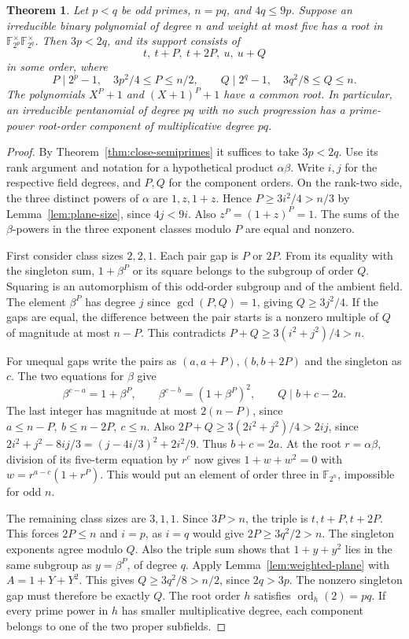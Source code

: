 \documentclass[11pt]{article}
\newtheorem{theorem}{Theorem}
\begin{document}
\begin{theorem}\label{thm:semiprime-gap}
Let \(p<q\) be odd primes, \(n=pq\), and \(4q\le9p\). Suppose an
irreducible binary polynomial of degree \(n\) and weight at most five
has a root in \(\mathbb F_{2^p}^\times\mathbb F_{2^q}^\times\).
Then \(3p<2q\), and its support consists of
\[
      t,\ t+P,\ t+2P,\ u,\ u+Q
\]
in some order, where
\[
  P\mid 2^p-1,\quad 3p^2/4\le P\le n/2,\qquad
  Q\mid 2^q-1,\quad 3q^2/8\le Q\le n .
\]
The polynomials \(X^P+1\) and \((X+1)^P+1\) have a common root.
In particular, an irreducible pentanomial of degree \(pq\) with no such progression has a prime-power
root-order component of multiplicative degree \(pq\).
\end{theorem}
\begin{proof}
By Theorem~\ref{thm:close-semiprimes} it suffices to take \(3p<2q\).
Use its rank argument and notation for a hypothetical product
\(\alpha\beta\). Write \(i,j\) for the respective field degrees,
and \(P,Q\) for the component orders. On the rank-two side, the
three distinct powers of \(\alpha\) are \(1,z,1+z\). Hence
\(P\ge3i^2/4>n/3\) by Lemma~\ref{lem:plane-size}, since
\(4j<9i\). Also \(z^P=(1+z)^P=1\). The sums of the \(\beta\)-powers
in the three exponent classes modulo \(P\) are equal and nonzero.

First consider class sizes \(2,2,1\). Each pair gap is \(P\) or
\(2P\). From its equality with the singleton sum, \(1+\beta^P\)
or its square belongs to the subgroup of order \(Q\). Squaring is
an automorphism of this odd-order subgroup and of the ambient field.
The element \(\beta^P\) has degree \(j\) since \(\gcd(P,Q)=1\),
giving \(Q\ge3j^2/4\). If the gaps are equal, the difference between
the pair starts is a nonzero multiple of \(Q\) of magnitude at most
\(n-P\). This contradicts \(P+Q\ge3(i^2+j^2)/4>n\).

For unequal gaps write the pairs as \((a,a+P),(b,b+2P)\) and the
singleton as \(c\). The two equations for \(\beta\) give
\[
   \beta^{c-a}=1+\beta^P,\qquad
   \beta^{c-b}=(1+\beta^P)^2,\qquad Q\mid b+c-2a.
\]
The last integer has magnitude at most \(2(n-P)\), since
\(a\le n-P,\ b\le n-2P,\ c\le n\).
Also \(2P+Q\ge3(2i^2+j^2)/4>2ij\), since
\(2i^2+j^2-8ij/3=(j-4i/3)^2+2i^2/9\).
Thus \(b+c=2a\). At the root \(r=\alpha\beta\), division of its
five-term equation by \(r^c\) now gives \(1+w+w^2=0\) with
\(w=r^{a-c}(1+r^P)\). This would put an element of order three in
\(\mathbb F_{2^n}\), impossible for odd \(n\).

The remaining class sizes are \(3,1,1\). Since \(3P>n\), the
triple is \(t,t+P,t+2P\). This forces \(2P\le n\) and \(i=p\),
as \(i=q\) would give \(2P\ge3q^2/2>n\). The singleton exponents
agree modulo \(Q\). Also the triple sum shows that \(1+y+y^2\)
lies in the same subgroup as \(y=\beta^P\), of degree \(q\).
Apply Lemma~\ref{lem:weighted-plane} with \(A=1+Y+Y^2\).
This gives \(Q\ge3q^2/8>n/2\), since \(2q>3p\).
The nonzero singleton gap must therefore be exactly \(Q\).
The root order \(h\) satisfies \(\operatorname{ord}_{h}(2)=pq\).
If every prime power in \(h\) has smaller multiplicative degree,
each component belongs to one of the two proper subfields.
\end{proof}
\end{document}
